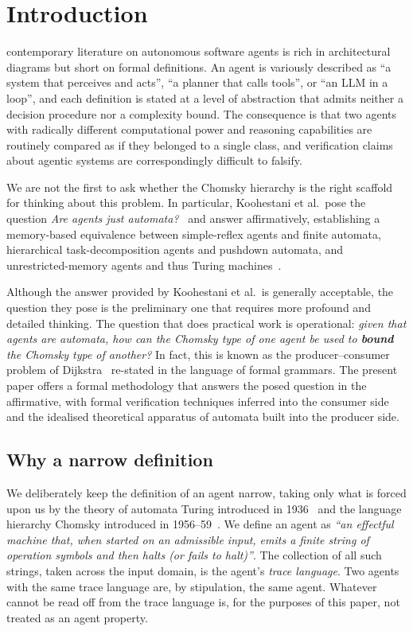 \section{Introduction}
\label{sec:introduction}

 contemporary literature on autonomous software agents is rich in architectural diagrams but short on formal definitions.  An agent is variously described as ``a system that perceives and acts'', ``a planner that calls tools'', or ``an LLM in a loop'', and each definition is stated at a level of abstraction that admits neither a decision procedure nor a complexity bound.  The consequence is that two agents with radically different computational power and reasoning capabilities are routinely compared as if they belonged to a single class, and verification claims about agentic systems are correspondingly difficult to falsify.

We are not the first to ask whether the Chomsky hierarchy is the right scaffold for thinking about this problem.  In particular, Koohestani et al.\ pose the question \emph{Are agents just automata?}~\cite{koohestani2025automata} and answer affirmatively, establishing a memory-based equivalence between simple-reflex agents and finite automata, hierarchical task-decomposition agents and pushdown automata, and unrestricted-memory agents and thus Turing machines~\cite{turing1936computable}.  

Although the answer provided by Koohestani et al.\ is generally acceptable, the question they pose is the preliminary one that requires more profound and detailed thinking.  The question that does practical work is operational: \emph{given that agents are automata, how can the Chomsky type of one agent be used to \textbf{bound} the Chomsky type of another?}  In fact, this is known as the producer--consumer problem of Dijkstra~\cite{dijkstra1968cooperating} re-stated in the language of formal grammars.  The present paper offers a formal methodology that answers the posed question in the affirmative, with formal verification techniques inferred into the consumer side and the idealised theoretical apparatus of automata built into the producer side.

\subsection{Why a narrow definition}

We deliberately keep the definition of an agent narrow, taking
only what is forced upon us by the theory of automata Turing
introduced in 1936~\cite{turing1936computable} and the language
hierarchy Chomsky introduced in
1956--59~\cite{chomsky1956three,chomsky1959certain}.  We define an agent as {\it ``an effectful machine that, when started on an
admissible input, emits a finite string of operation symbols and
then halts (or fails to halt)''}.  The collection of all such
strings, taken across the input domain, is the agent's
\emph{trace language}.  Two agents with the same trace language
are, by stipulation, the same agent.  Whatever cannot be read off
from the trace language is, for the purposes of this paper, not
treated as an agent property.

